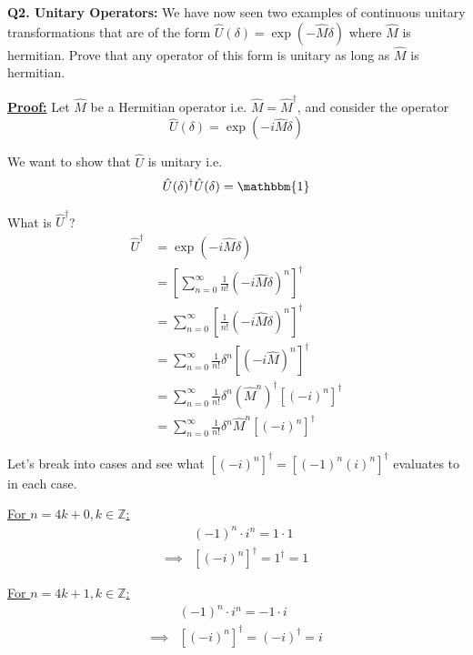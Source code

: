 \documentclass{article}
\begin{document}
\begin{dottedbox}
  \textbf{Q2. Unitary Operators:} We have now seen two examples of continuous unitary transformations that are of the form $\hat{U}(\delta) = \exp(-\hat{M}\delta)$ where $\hat{M}$ is hermitian. Prove that any operator of this form is unitary as long as $\hat{M}$ is hermitian.
\end{dottedbox}

\vskip 1cm
\underline{\textbf{Proof:}} Let $\hat{M}$ be a Hermitian operator i.e. $\hat{M} = \hat{M}^{\dagger}$, and consider the operator
\[ \hat{U}(\delta) = \exp(-i\hat{M}\delta) \]

We want to show that $\hat{U}$ is unitary i.e.
\[ \hat{U}(\delta)^{\dagger} \hat{U}(\delta) = \mathbbm{1} \]

What is $\hat{U}^{\dagger}$? 
\begin{align*}
  \hat{U}^{\dagger} &= \exp(-i \hat{M} \delta) \\
  &= \left[ \sum_{n = 0}^{\infty} \frac{1}{n!} \left( -i \hat{M} \delta \right)^n \right]^{\dagger} \\
  &= \sum_{n = 0}^{\infty} \left[  \frac{1}{n!} \left( -i \hat{M} \delta \right)^n \right]^{\dagger} \\
  &= \sum_{n = 0}^{\infty} \frac{1}{n!} \delta^n \left[ (-i\hat{M})^n \right]^{\dagger} \\
  &= \sum_{n = 0}^{\infty} \frac{1}{n!} \delta^n (\hat{M}^n)^{\dagger} \left[ (-i)^n \right]^{\dagger} \\
  &= \sum_{n = 0}^{\infty} \frac{1}{n!} \delta^n \hat{M}^n \left[ (-i)^n \right]^{\dagger} 
\end{align*} 

Let's break into cases and see what $\left[ (-i)^n \right]^{\dagger} = \left[ (-1)^n (i)^n \right]^{\dagger}$ evaluates to in each case.

\vskip 0.25cm
\underline{For $n = 4k + 0, k \in \mathbb{Z}$:}
\begin{align*}
  &(-1)^n \cdot i^n = 1 \cdot 1 \\
  \implies &\left[(-i)^n\right]^{\dagger} = 1^{\dagger} = 1
\end{align*}

\vskip 0.25cm
\underline{For $n = 4k + 1, k \in \mathbb{Z}$:}
\begin{align*}
  &(-1)^n \cdot i^n = -1 \cdot i \\
  \implies &\left[(-i)^n\right]^{\dagger} = (-i)^{\dagger} = i
\end{align*}
\end{document}
